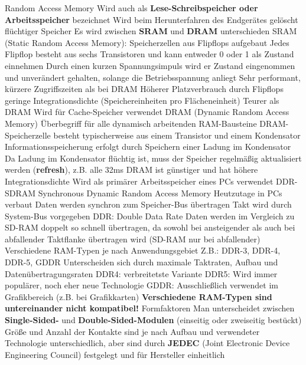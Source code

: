 \documentclass[asp1.tex]{subfiles}
\begin{document}
\begin{outline}
    \1 Random Access Memory
    \1 Wird auch als \textbf{Lese-Schreibspeicher oder Arbeitsspeicher} bezeichnet
    \1 Wird beim Herunterfahren des Endgerätes gelöscht \textrightarrow\space flüchtiger Speicher
    \1 Es wird zwischen \textbf{SRAM} und \textbf{DRAM} unterschieden
    \1 SRAM (Static Random Access Memory):
    \2 Speicherzellen aus Flipflops aufgebaut
    \2 Jedes Flipflop besteht aus sechs Transistoren und kann entweder 0 oder 1 als Zustand einnehmen
    \2 Durch einen kurzen Spannungsimpuls wird er Zustand eingenommen und unverändert gehalten, solange die Betriebsspannung anliegt
    \2 Sehr performant, kürzere Zugriffszeiten als bei DRAM
    \2 Höherer Platzverbrauch durch Flipflops \textrightarrow\space geringe Integrationsdichte (Speichereinheiten pro Flächeneinheit)
    \2 Teurer als DRAM
    \2 Wird für Cache-Speicher verwendet
    \1 DRAM (Dynamic Random Access Memory)
    \2 Überbegriff für alle dynamisch arbeitenden RAM-Bausteine
    \2 DRAM-Speicherzelle besteht typischerweise aus einem Transistor und einem Kondensator
    \2 Informationsspeicherung erfolgt durch Speichern einer Ladung im Kondensator
    \2 Da Ladung im Kondensator flüchtig ist, muss der Speicher regelmäßig aktualisiert werden (\textbf{refresh}), z.B. alle 32ms
    \2 DRAM ist günstiger und hat höhere Integrationsdichte
    \2 Wird als primärer Arbeitsspeicher eines PCs verwendet
    \1 DDR-SDRAM
    \2 Synchronous Dynamic Random Access Memory
    \2 Heutzutage in PCs verbaut
    \2 Daten werden synchron zum Speicher-Bus übertragen
    \2 Takt wird durch System-Bus vorgegeben
    \2 DDR: Double Data Rate \textrightarrow\space Daten werden im Vergleich zu SD-RAM doppelt so schnell übertragen, da sowohl bei ansteigender als auch bei abfallender Taktflanke übertragen wird (SD-RAM nur bei abfallender)
    \1 Verschiedene RAM-Typen je nach Anwendungsgebiet
    \2 Z.B.: DDR-3, DDR-4, DDR-5, GDDR
    \2 Unterscheiden sich durch maximale Taktraten, Aufbau und Datenübertragungsraten
    \2 DDR4: verbreitetste Variante
    \2 DDR5: Wird immer populärer, noch eher neue Technologie
    \2 GDDR: Ausschließlich verwendet im Grafikbereich (z.B. bei Grafikkarten)
    \2 \textbf{Verschiedene RAM-Typen sind untereinander nicht kompatibel!}
    \1 Formfaktoren
    \2 Man unterscheidet zwischen \textbf{Single-Sided-} und \textbf{Double-Sided-Modulen} (einseitig oder zweiseitig bestückt)
    \2 Größe und Anzahl der Kontakte sind je nach Aufbau und verwendeter Technologie unterschiedlich, aber sind durch \textbf{JEDEC} (Joint Electronic Device Engineering Council) festgelegt und für Hersteller einheitlich

\end{outline}
\end{document}
